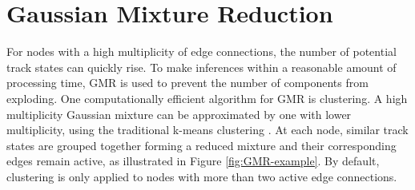 




\section{Gaussian Mixture Reduction}
\label{section-GMR}

For nodes with a high multiplicity of edge connections, the number of potential track states can quickly rise. To make inferences within a reasonable amount of processing time, GMR is used to prevent the number of components from exploding. One computationally efficient algorithm for GMR is clustering. A high multiplicity Gaussian mixture can be approximated by one with lower multiplicity, using the traditional k-means clustering \cite{kmeans}. At each node, similar track states are grouped together forming a reduced mixture and their corresponding edges remain active, as illustrated in Figure \ref{fig:GMR-example}. By default, clustering is only applied to nodes with more than two active edge connections.


